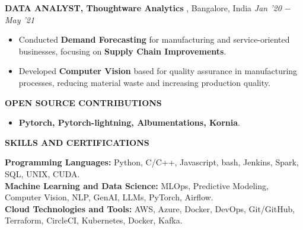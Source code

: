 \documentclass[10pt,a4]{article}
\begin{document}
{\begin{flushleft}
    \textbf{\large DATA ANALYST, Thoughtware Analytics },  Bangalore, India \hfill \textit{\large Jan '20 $-$ May '21}	\\		
    \begin{itemize}
          
        \item Conducted \textbf{Demand Forecasting} for manufacturing and service-oriented businesses, focusing on \textbf{Supply Chain Improvements}.
        \item Developed \textbf{Computer Vision} based  for quality assurance in manufacturing processes, reducing material waste and increasing production quality.   
    \end{itemize}
    
\end{flushleft}

\begin{flushleft}
    \textbf{\large OPEN SOURCE CONTRIBUTIONS}
    \begin{itemize}
        \item \textbf{Pytorch, Pytorch-lightning, Albumentations, Kornia}.
    \end{itemize}
\end{flushleft}



\begin{flushleft}
    {\large \textbf {SKILLS AND CERTIFICATIONS}}
    
        \vspace{1mm}
            \hspace{0.5cm}  \textbf{Programming Languages:} Python, C/C++, Javascript, bash, Jenkins, Spark, SQL, UNIX, CUDA. \\
            \hspace{0.5cm}  \textbf{Machine Learning and Data Science:} MLOps, Predictive Modeling, Computer Vision, NLP, GenAI, LLMs, PyTorch, Airflow. \\
            \hspace{0.5cm}  \textbf{Cloud Technologies and Tools:} AWS, Azure, Docker, DevOps, Git/GitHub, Terraform, CircleCI, Kubernetes, Docker, Kafka. \\
        


\end{flushleft}}
\end{document}
